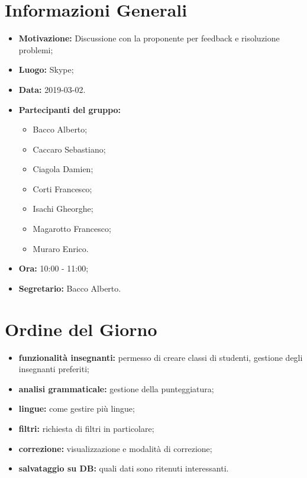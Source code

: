 \documentclass[a4paper, oneside, openany, dvipsnames, table]{article}
\begin{document}
\copertina{}


\newpage
\tableofcontents
\newpage
\section{Informazioni Generali}
\begin{itemize}
\item \textbf{Motivazione:} Discussione con la proponente per feedback e risoluzione problemi;
\item \textbf{Luogo:} Skype;
\item \textbf{Data:} 2019-03-02.
\item \textbf{Partecipanti del gruppo:} \hfill
	\begin{itemize}
	\item Bacco Alberto;
	\item Caccaro Sebastiano;
	\item Ciagola Damien;
	\item Corti Francesco;
	\item Isachi Gheorghe;
	\item Magarotto Francesco;
	\item Muraro Enrico.
	\end{itemize} 
\item \textbf{Ora:} 10:00 - 11:00;
\item \textbf{Segretario:} Bacco Alberto.
\end{itemize}

\section{Ordine del Giorno}
\begin{itemize}
	\item \textbf{funzionalità insegnanti:} permesso di creare classi di studenti, gestione degli insegnanti preferiti;
	\item \textbf{analisi grammaticale:} gestione della punteggiatura;
	\item \textbf{lingue:} come gestire più lingue;
	\item \textbf{filtri:} richiesta di filtri in particolare;
	\item \textbf{correzione:} visualizzazione e modalità di correzione;
	\item \textbf{salvataggio su DB:} quali dati sono ritenuti interessanti.
\end{itemize}
\end{document}
